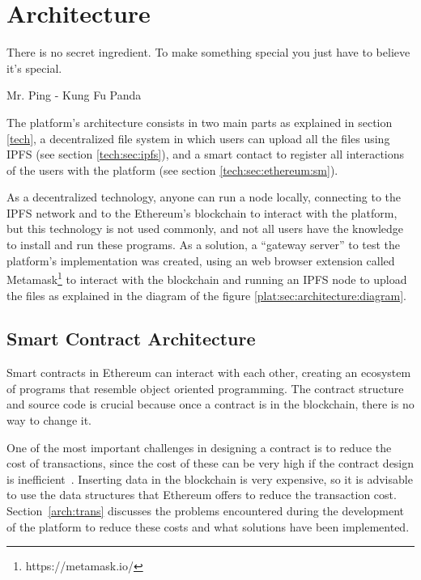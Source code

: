 
\chapter{Architecture}

\begin{FraseCelebre}
  \begin{Frase}
    There is no secret ingredient. To make something special you just have to
    believe it's special.
  \end{Frase}
  \begin{Fuente}
    Mr. Ping - Kung Fu Panda
  \end{Fuente}
\end{FraseCelebre}

The platform's architecture consists in two main parts as explained in section
\ref{tech}, a decentralized file system in which users can upload all the files
using IPFS (see section \ref{tech:sec:ipfs}), and a smart contact to register
all interactions of the users with the platform (see section
\ref{tech:sec:ethereum:sm}).

As a decentralized technology, anyone can run a node locally, connecting to the
IPFS network and to the Ethereum's blockchain to interact with the platform, but
this technology is not used commonly, and not all users have the knowledge to
install and run these programs. As a solution, a ``gateway server'' to test the
platform's implementation was created, using an web browser extension called
Metamask\footnote[1]{https://metamask.io/} to interact with the blockchain and
running an IPFS node to upload the files as explained in the diagram of the
figure \ref{plat:sec:architecture:diagram}.


\section{Smart Contract Architecture}
\label{arch:sca}
Smart contracts in Ethereum can interact with each other, creating an ecosystem
of programs that resemble object oriented programming. The contract structure
and source code is crucial because once a contract is in the blockchain, there
is no way to change it.

One of the most important challenges in designing a contract is to reduce the
cost of transactions, since the cost of these can be very high if the contract
design is inefficient~\cite{croman2016scaling}. Inserting data in the blockchain
is very expensive, so it is advisable to use the data structures that Ethereum
offers to reduce the transaction cost. Section~\ref{arch:trans} discusses the
problems encountered during the development of the platform to reduce these
costs and what solutions have been implemented.

